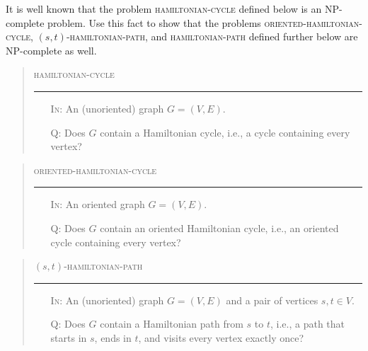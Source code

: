 \documentclass[a4paper,12pt]{amsart}
\begin{document}
        
        \medskip\begin{problem}
        It is well known that the problem \textsc{hamiltonian-cycle} defined below is an NP-complete problem. Use this fact to show that the problems \textsc{oriented-hamiltonian-cycle}, \textsc{$(s,t)$-hamiltonian-path}, and \textsc{hamiltonian-path} defined further below are NP-complete as well.
        
        \bigskip
        \begin{quote}
        \begin{mdframed}
        \textsc{hamiltonian-cycle}
        \medskip\hrule\medskip
        \begin{itemize}
            \item[\textsc{In:}] An (unoriented) graph $G=(V,E)$.
            \item[\textsc{Q:}] Does $G$ contain a Hamiltonian cycle, i.e., a cycle containing every vertex?
        \end{itemize}
        \end{mdframed}
        \end{quote}
        
        
        \bigskip
        \begin{quote}
        \begin{mdframed}
        \textsc{oriented-hamiltonian-cycle}
        \medskip\hrule\medskip
        \begin{itemize}
            \item[\textsc{In:}] An oriented graph $G=(V,E)$.
            \item[\textsc{Q:}] Does $G$ contain an oriented Hamiltonian cycle, i.e., an oriented cycle containing every vertex?
        \end{itemize}
        \end{mdframed}
        \end{quote}
        
        \bigskip
        \begin{quote}
        \begin{mdframed}
        \textsc{$(s,t)$-hamiltonian-path}
        \medskip\hrule\medskip
        \begin{itemize}
            \item[\textsc{In:}] An (unoriented) graph $G=(V,E)$ and a pair of vertices $s,t\in V$.
            \item[\textsc{Q:}] Does $G$ contain a Hamiltonian path from $s$ to $t$, i.e., a path that starts in $s$, ends in $t$, and visits every vertex exactly once?
        \end{itemize}
        \end{mdframed}
        \end{quote}
        

\end{problem}
\end{document}
